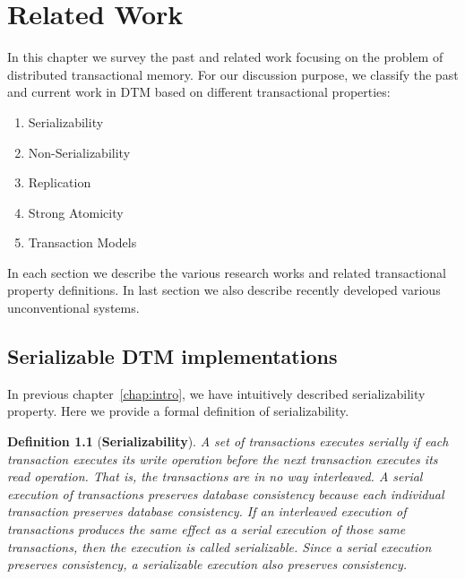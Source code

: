 \documentclass[12pt,english]{report}
\newtheorem{definition}{Definition}[section]
\begin{document}
\chapter{Related Work}\label{chap:relWork}

In this chapter we survey the past and related work focusing on the problem of distributed transactional memory. For our discussion purpose, we classify the past and current work in DTM based on different transactional properties:

\begin{enumerate}
\item Serializability
\item Non-Serializability 
\item Replication 
\item Strong Atomicity
\item Transaction Models
\end{enumerate}

In each section we describe the various research works and related transactional property definitions. In last section we also describe recently developed various unconventional systems.

\section{Serializable DTM implementations}

In previous chapter~\ref{chap:intro}, we have intuitively described serializability property. Here we provide a formal definition of serializability. 

\begin{definition}[\textbf{Serializability}]
A set of transactions executes serially if each transaction executes its write operation before the next transaction executes its read operation. That is, the transactions are in no way interleaved. A serial execution of transactions preserves database consistency because each individual transaction preserves
database consistency. If an interleaved execution of transactions produces the same effect as a serial execution of those same transactions, then the execution is called serializable. Since a serial execution preserves consistency, a serializable execution also preserves consistency.~\cite{serializabilityFormal}
\end{definition}
\end{document}
